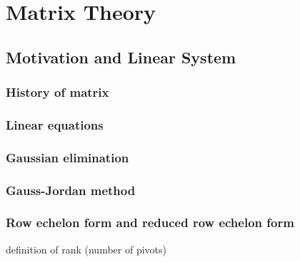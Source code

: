 \chapter{Matrix Theory}


\section{Motivation and Linear System}%

\subsection{History of matrix}

\subsection{Linear equations}

\subsection{Gaussian elimination}


\subsection{Gauss-Jordan method}

\subsection{Row echelon form and reduced row echelon form}

definition of rank (number of pivots)



